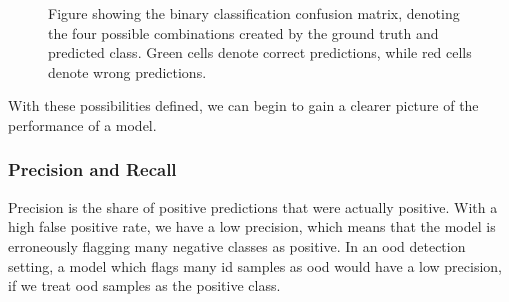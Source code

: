 \documentclass[UKenglish]{uiomasterthesis} %
\theoremstyle{definition}
\begin{document}
\begin{figure}[hbtp]
    \begin{center}


\end{center}
    \caption[Binary classification confusion matrix]{Figure showing the binary classification confusion matrix, denoting the four possible combinations created by the ground truth and predicted class. Green cells denote correct predictions, while red cells denote wrong predictions.}
\label{fig:confusion}
\end{figure}

With these possibilities defined, we can begin to gain a clearer picture of the performance of a model.

\subsubsection{Precision and Recall}

Precision is the share of positive predictions that were actually positive. With a high false positive rate, we have a low precision, which means that the model is erroneously flagging many negative classes as positive. In an \ac{ood} detection setting, a model which flags many \ac{id} samples as \ac{ood} would have a low precision, if we treat \ac{ood} samples as the positive class.
\end{document}
